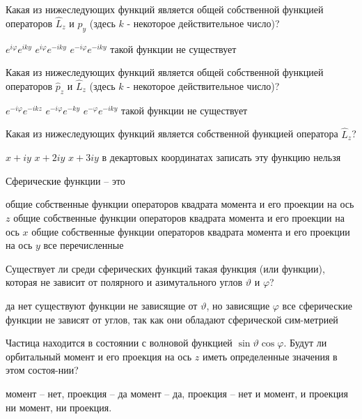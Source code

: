 \documentclass[11pt,a4paper]{exam}
\begin{document}
\begin{questions}
\question Какая из нижеследующих функций является общей собственной функцией операторов ${\hat L_z}$ и ${\hat p_y}$ (здесь $k$ - некоторое действительное число)?
\begin{choices}
\choice ${e^{i\varphi }}{e^{iky}}$    
\choice ${e^{i\varphi }}{e^{ - iky}}$    
\choice ${e^{ - i\varphi }}{e^{ - iky}}$    
\choice такой функции не существует
\end{choices}

\question Какая из нижеследующих функций является общей собственной функцией операторов ${\hat p_z}$ и ${\hat L_z}$ (здесь $k$ - некоторое действительное число)?
\begin{choices}
\choice ${e^{ - i\varphi }}{e^{ - ikz}}$    
\choice ${e^{ - i\varphi }}{e^{ - ky}}$     
\choice ${e^{ - \varphi }}{e^{ - iky}}$     
\choice такой функции не существует
\end{choices}

\question Какая из нижеследующих функций является собственной функцией оператора ${\hat L_z}$?
\begin{choices}
\choice $x + iy$    
\choice $x + 2iy$
\choice $x + 3iy$      
\choice в декартовых координатах записать эту функцию нельзя
\end{choices}

\question Сферические функции – это
\begin{choices}
\choice общие собственные функции операторов квадрата момента и его проекции на ось $z$
\choice общие собственные функции операторов квадрата момента и его проекции на ось $x$
\choice общие собственные функции операторов квадрата момента и его проекции на ось $y$
\choice все перечисленные
\end{choices}

\question Существует ли среди сферических функций такая функция (или функции), которая не зависит от полярного и азимутального углов $\vartheta $ и $\varphi $?
\begin{choices}
\choice да
\choice нет
\choice существуют функции не зависящие от $\vartheta $, но зависящие $\varphi $
\choice все сферические функции не зависят от углов, так как они обладают сферической сим-метрией
\end{choices}

\question Частица находится в состоянии с волновой функцией $\sin \vartheta \cos \varphi $. Будут ли орбитальный момент и его проекция на ось $z$ иметь определенные значения в этом состоя-нии?
\begin{choices}
\choice момент – нет, проекция – да         
\choice момент – да, проекция – нет 
\choice и момент, и проекция          
\choice ни момент, ни проекция.
\end{choices}


\end{questions}
\end{document}
